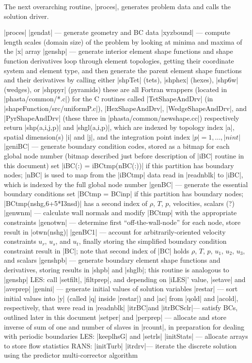 \documentclass[11pt]{article}
\begin{document}
The next overarching routine, |proces|, generates problem data and calls the solution driver.
\begin{outline}[deep]
\1 |proces|
	\2 |gendat| --- generate geometry and BC data
		\3 |xyzbound| --- compute length scales (domain size) of the problem by looking at minima and maxima of the |x| array
		\3 |genshp| --- generate interior element shape functions and shape function derivatives
			\4 loop through element topologies, getting their coordinate system and element type, and then generate the parent element shape functions and their derivatives by calling either |shpTet| (tets), |shphex| (hexes), |shp6w| (wedges), or |shppyr| (pyramids)
			\4 these are all Fortran wrappers (located in |phasta/common/*.c|) for the C routines called |TetShapeAndDrv| (in |shapeFunction/src/uniformP.c|), |HexShapeAndDrv|, |WedgeShapeAndDrv|, and |PyrShapeAndDrv| (these three in |phasta/common/newshape.cc|) respectively
			\4 return |shp(a,i,j,p)| and |shgl(a,i,p)|, which are indexed by topology index |a|, spatial dimension(s) |i| and |j|, and the integration point index $|p| = 1, ..., |nint|$
		\3 |geniBC| --- generate boundary condition codes, stored as a bitmap for each global node number (bitmap described just before description of |iBC| routine in this document)
			\4 set |iBC(:) = iBCtmp(nBC(:))| if this partition has boundary nodes; |nBC| is used to map from the |iBCtmp| data read in |readnblk| to |iBC|, which is indexed by the full global node number
		\3 |genBC| --- generate the essential boundary conditions
			\4 set |BCtmp = BCinp| if this partition has boundary nodes; |BCtmp(nshg,6+5*I3nsd)| has a second index of $\rho$, $T$, $p$, velocities, scalars (?)
			\4 |genwnm| --- calculate wall normals and modify |BCtmp| with the appropriate constraints
			\4 |genotwn| --- determine first ``off-the-wall-node'' for each node, store result in |otwn(nshg)|
			\4 |genBC1| --- account for arbitrarily-oriented velocity constraints $u_r$, $u_s$, and $u_t$, finally storing the simplified boundary condition constraint result in |BC|; note that second index of |BC| holds $\rho$, $T$, $p$, $u_1$, $u_2$, $u_3$, and scalars
		\3 |genshpb| --- generate boundary element shape functions and derivatives, storing results in |shpb| and |shglb|; this routine is analogous to |genshp|
		\3 LES: call |setfilt|, |filtprep|, and depending on |iLES|' value, |setave| and |aveprep|
		\3 |genini| --- generate initial values of solution variables
			\4 |restar| --- sort initial values into |y| (called |q| inside |restar|) and |ac| from |qold| and |acold|, respectively, that were read in |readnblk|
			\4 |itrBC|\ra and |itrBCSclr|\ra --- satisfy BCs, outlined later in this document
	\2 |setper| and |perprep| --- allocate and store inverse of sum of one and number of slaves in |rcount|, in preparation for dealing with periodic boundaries
	\2 LES: |keeplhsG| and |setrls|
	\2 |initStats| --- allocate arrays to store flow statistics
	\2 RANS: |initTurb|
	\2 |itrdrv|\ra --- iterate the discrete solution using the predictor multi-corrector algorithm
\end{outline}
\end{document}
